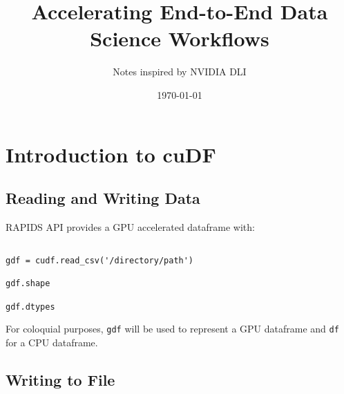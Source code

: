 \documentclass{article}
\title{Accelerating End-to-End Data Science Workflows}
\author{Notes inspired by NVIDIA DLI}
\date{\today}
\begin{document}
\maketitle

\section{Introduction to cuDF}
\subsection{Reading and Writing Data}
RAPIDS API provides a GPU accelerated dataframe with:

\begin{verbatim}

gdf = cudf.read_csv('/directory/path')

gdf.shape

gdf.dtypes

\end{verbatim}

For coloquial purposes, \verb_gdf_ will be used to represent a GPU dataframe and \verb_df_ for a CPU dataframe.

\subsection{Writing to File}
\end{document}
